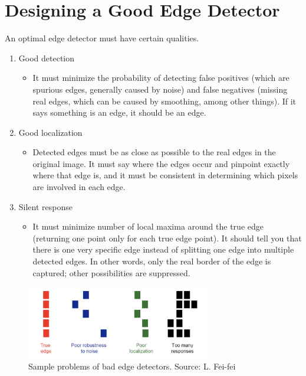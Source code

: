 \documentclass{article}
\begin{document}
\section{Designing a Good Edge Detector}
An optimal edge detector must have certain qualities.
\begin{enumerate}
    \item Good detection
    \begin{itemize}
        \item It must minimize the probability of detecting false positives (which are spurious edges, generally caused by noise) and false negatives (missing real edges, which can be caused by smoothing, among other things). If it says something is an edge, it should be an edge.
    \end{itemize}
    \item Good localization
    \begin{itemize}
        \item Detected edges must be as close as possible to the real edges in the original image. It must say where the edges occur and pinpoint exactly where that edge is, and it must be consistent in determining which pixels are involved in each edge.
    \end{itemize}
    \item Silent response
    \begin{itemize}
        \item It must minimize number of local maxima around the true edge (returning one point only for each true edge point). It should tell you that there is one very specific edge instead of splitting one edge into multiple detected edges. In other words, only the real border of the edge is captured; other possibilities are suppressed.
    \end{itemize}
\end{enumerate}

\begin{figure}[H]
\caption{Sample problems of bad edge detectors. Source: L. Fei-fei}
\centering
\includegraphics[width=8cm]{fei-fei_detection.png}
\end{figure}
\end{document}
